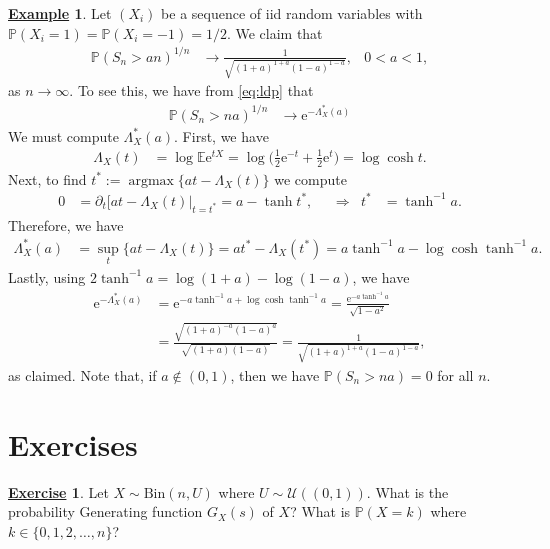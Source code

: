\documentclass[12pt]{book}
\numberwithin{equation}{chapter}
\theoremstyle{plain}
\numberwithin{theorem}{section}
\theoremstyle{definition}
\newtheorem{example}[theorem]{\underline{Example}}
\newtheorem{exercise}{\underline{Exercise}}
\numberwithin{exercise}{chapter}
\newcommand{\<}{\langle}
\renewcommand{\>}{\rangle}
\renewcommand{\(}{\left(}
\renewcommand{\)}{\right)}
\renewcommand{\[}{\left[}
\renewcommand{\]}{\right]}
\newcommand\Eb{\mathds{E}}
\newcommand\Pb{\mathds{P}}
\newcommand\Uc{\mathscr{U}}
\newcommand\Lam{\Lambda}
\renewcommand\d{\partial}
\newcommand\ee{\mathrm{e}}
\begin{document}
\begin{example}
Let $(X_i)$ be a sequence of iid random variables with $\Pb(X_i = 1) = \Pb(X_i = -1) = 1/2$.  We claim that 
\begin{align}
\Pb( S_n > a n)^{1/n} 
	&\to \frac{1}{\sqrt{(1+a)^{1+a}(1-a)^{1-a}}} , &
0
	<a < 1 ,
\end{align}
as $n \to \infty$.  To see this, we have from \eqref{eq:ldp} that
\begin{align}
\Pb(S_n > na)^{1/n}
	&\to \ee^{- \Lam_X^*(a)}
\end{align}
We must compute $\Lam_X^*(a)$.  First, we have
\begin{align}
\Lam_X(t)
	&=	\log \Eb \ee^{t X}
	=		\log \Big( \tfrac{1}{2} \ee^{-t} + \tfrac{1}{2} \ee^t \Big) 
	=		\log \cosh t .
\end{align}
Next, to find $t^* := \operatorname*{arg max} \{ a t - \Lam_X(t) \}$ we compute
\begin{align}
0
	&=	\d_t \Big[ a t - \Lam_X(t) \Big|_{t = t^*}
	=		a - \tanh t^* , &
	&\Rightarrow&
t^*
	&=	\tanh^{-1} a .
\end{align}
Therefore, we have
\begin{align}
\Lam_X^*(a)
	&=	\sup_t \{ a t - \Lam_X(t) \}
	=		a t^* - \Lam_X(t^*)
	=		a \tanh^{-1} a - \log \cosh \tanh^{-1} a .
\end{align}
Lastly, using $2 \tanh^{-1} a = \log (1+a) - \log (1-a)$, we have
\begin{align}
\ee^{- \Lam_X^*(a)}
	&=	\ee^{ - a \tanh^{-1} a + \log \cosh \tanh^{-1} a}
	=		\frac{\ee^{-a \tanh^{-1} a}}{\sqrt{1-a^2}} \\
	&=	\frac{\sqrt{(1+a)^{-a} (1-a)^a}}{\sqrt{(1+a)(1-a)}}
	=		\frac{1}{\sqrt{(1+a)^{1+a}(1-a)^{1-a}}} ,
\end{align}
as claimed.  Note that, if $a \notin (0,1)$, then we have $\Pb( S_n > n a) = 0$ for all $n$.
\end{example}


\section{Exercises}
\label{sec:exercises-3}

\begin{exercise}
\label{exer:3.1}
Let $X \sim \text{Bin}(n,U)$ where $U \sim \Uc((0,1))$.  What is the probability Generating function $G_X(s)$ of $X$?  What is $\Pb( X = k)$ where $k \in \{0, 1, 2, \ldots , n \}$?
\end{exercise}
\end{document}
